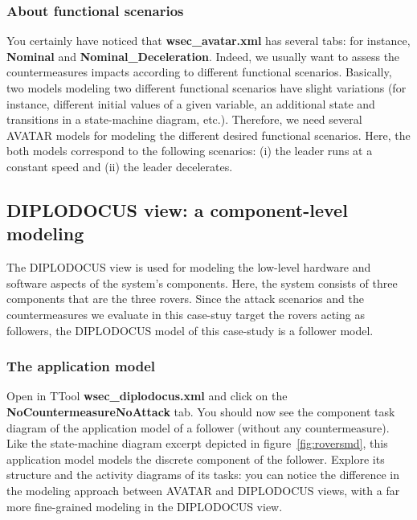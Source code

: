\documentclass{article}
\begin{document}
\subsubsection{About functional scenarios}

You certainly have noticed that \textbf{wsec\_avatar.xml} has several tabs: for instance, \textbf{Nominal} and \textbf{Nominal\_Deceleration}. Indeed, we usually want to assess the countermeasures impacts according to different functional scenarios. Basically, two models modeling two different functional scenarios have slight variations (for instance, different initial values of a given variable, an additional state and transitions in a state-machine diagram, etc.). Therefore, we need several AVATAR models for modeling the different desired functional scenarios. Here, the both models correspond to the following scenarios: (i) the leader runs at a constant speed and (ii) the leader decelerates.


\subsection{DIPLODOCUS view: a component-level modeling}

The DIPLODOCUS view is used for modeling the low-level hardware and software aspects of the system's components. Here, the system consists of three components that are the three rovers. Since the attack scenarios and the countermeasures we evaluate in this case-stuy target the rovers acting as followers, the DIPLODOCUS model of this case-study is a follower model.

\subsubsection{The application model}

Open in TTool \textbf{wsec\_diplodocus.xml} and click on the \textbf{NoCountermeasureNoAttack} tab. You should now see the component task diagram of the application model of a follower (without any countermeasure). Like the state-machine diagram excerpt depicted in figure~\ref{fig:roversmd}, this application model models the discrete component of the follower. Explore its structure and the activity diagrams of its tasks: you can notice the difference in the modeling approach between AVATAR and DIPLODOCUS views, with a far more fine-grained modeling in the DIPLODOCUS view.
\end{document}
